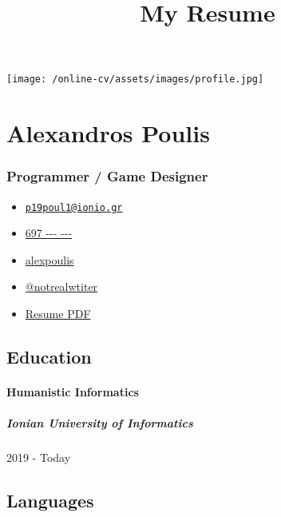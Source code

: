 \documentclass[english,]{article}
\title{My Resume}
\date{}
\providecommand{\tightlist}{%
  \setlength{\itemsep}{0pt}\setlength{\parskip}{0pt}}
\let\oldparagraph\paragraph
\renewcommand{\paragraph}[1]{\oldparagraph{#1}\mbox{}}
\let\oldsubparagraph\subparagraph
\renewcommand{\subparagraph}[1]{\oldsubparagraph{#1}\mbox{}}
\begin{document}
\maketitle

\texttt{[image: /online-cv/assets/images/profile.jpg]}

\hypertarget{alexandros-poulis}{%
\section{Alexandros Poulis}\label{alexandros-poulis}}

\hypertarget{programmer-game-designer}{%
\subsubsection{Programmer / Game
Designer}\label{programmer-game-designer}}

\begin{itemize}
\tightlist
\item
  \emph{} \href{mailto:p19poul1@ionio.gr}{\nolinkurl{p19poul1@ionio.gr}}
\item
  \emph{} \href{tel:697\%20---\%20---}{697 -\/-\/- -\/-\/-}
\item
  \emph{} \href{http://github.com/alexpoulis}{alexpoulis}
\item
  \emph{} \href{https://twitter.com/@notrealwtiter}{@notrealwtiter}
\item
  \emph{}
  \href{https://github.com/alexpoulis/online-cv/raw/master/pdf/cv.pdf}{Resume
  PDF}
\end{itemize}

\hypertarget{education}{%
\subsection{Education}\label{education}}

\hypertarget{humanistic-informatics}{%
\paragraph{Humanistic Informatics}\label{humanistic-informatics}}

\hypertarget{ionian-university-of-informatics}{%
\subparagraph{Ionian University of
Informatics}\label{ionian-university-of-informatics}}

2019 - Today

\hypertarget{languages}{%
\subsection{Languages}\label{languages}}
\end{document}
